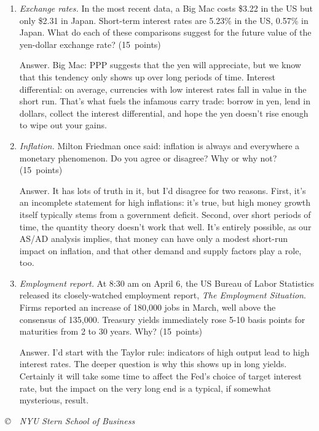\documentclass[letterpaper,12pt]{article}
\begin{document}
\begin{enumerate}
\begin{enumerate}
\item {\it Exchange rates.\/}
In the most recent data, a Big Mac costs \$3.22 in the US but only
\$2.31 in Japan.
Short-term interest rates are 5.23\% in the US, 0.57\% in Japan.
What do each of these comparisons suggest for the future value of the 
yen-dollar exchange rate?  
(15~points) 

Answer.  Big Mac:  PPP suggests that the yen will appreciate, 
but we know that this tendency only shows up over long periods of time.  
Interest differential:  on average, currencies with low interest rates
fall in value in the short run.
That's what fuels the infamous carry trade:  borrow in yen, 
lend in dollars, collect the interest differential, 
and hope the yen doesn't rise enough to wipe out your gains.  

\item {\it Inflation.\/}
Milton Friedman once said:  inflation is always and everywhere a monetary phenomenon. 
Do you agree or disagree?  Why or why not?  (15~points)

Answer.  It has lots of truth in it, but I'd disagree for two reasons. 
First, it's an incomplete statement for high inflations: 
it's true, but high money growth itself typically stems from 
a government deficit.
Second, over short periods of time, the quantity theory doesn't work 
that well.  
It's entirely possible, as our AS/AD analysis implies, that 
money can have only a modest short-run impact on inflation, 
and that other demand and supply factors play a role, too.  

\item {\it Employment report.\/} 
At 8:30 am on April 6, the US Bureau of Labor Statistics released
its closely-watched employment report, {\it The Employment Situation\/}.
Firms reported an increase of 180,000 jobs in March, 
well above the consensus of 135,000.  
Treasury yields immediately rose 5-10 basis points 
for maturities from 2 to 30 years.  
Why?  
(15~points)

Answer.  I'd start with the Taylor rule:  indicators of high output 
lead to high interest rates.
The deeper question is why this shows up in long yields.
Certainly it will take some time to affect the Fed's choice of 
target interest rate, but the impact on the very long end is a 
typical, if somewhat mysterious, result.  

\end{enumerate}

\end{enumerate}


\vfill \centerline{\it \copyright \ \number\year \ 
NYU Stern School of Business}
\end{document}
